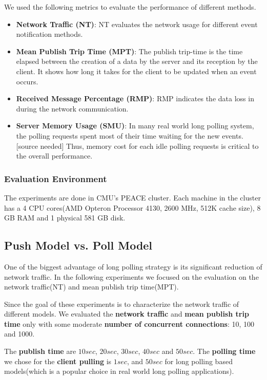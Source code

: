 We used the following metrics to evaluate the performance of different
methods.
\begin{itemize}
    \item {\bf Network Traffic (NT)}: NT evaluates the network usage for
        different event notification methods.
    \item {\bf Mean Publish Trip Time (MPT)}: The publish trip-time is 
        the time elapsed between the creation of a data by the server and 
        its reception by the client. It shows how long it takes for the 
        client to be updated when an event occurs.
    \item {\bf Received Message Percentage (RMP)}: RMP indicates the data 
        loss in during the network communication. 
    \item {\bf Server Memory Usage (SMU)}: In many real world long polling 
        system, the polling requests spent most of their time waiting for 
        the new events.[source needed] Thus, memory cost for each idle 
        polling requests is critical to the overall performance.
\end{itemize}

\subsubsection{Evaluation Environment \\}
The experiments are done in CMU's PEACE cluster. Each machine in the cluster 
has a 4 CPU cores(AMD Opteron Processor 4130, 2600 MHz, 512K cache size),
8 GB RAM and 1 physical 581 GB disk.

\subsection{Push Model vs. Poll Model\\}

One of the biggest advantage of long polling strategy is its significant 
reduction of network traffic. In the following experiments we focused on
the evaluation on the network traffic(NT) and mean publish trip time(MPT).

Since the goal of these experiments is to characterize the network traffic 
of different models. We evaluated the {\bf network traffic} and {\bf mean 
publish trip time} only with some moderate {\bf number of concurrent 
connections}: 10, 100 and 1000. 

The {\bf publish time} are $10 sec$, $20 sec$, $30 sec$, $40 sec$ and 
$50 sec$. The {\bf polling time} we chose for the {\bf client pulling}
is $1 sec$, and $50 sec$ for long polling based models(which is a 
popular choice in real world long polling applications).

